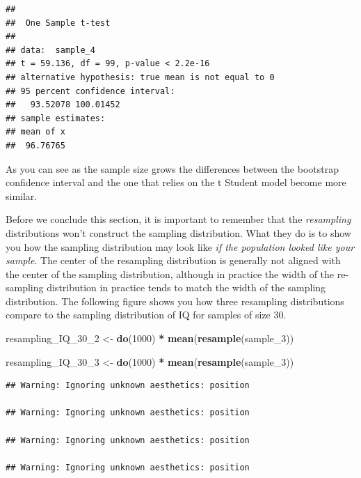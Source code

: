 \documentclass[]{book}
\newenvironment{Shaded}{\begin{snugshade}}{\end{snugshade}}
\newcommand{\DecValTok}[1]{\textcolor[rgb]{0.00,0.00,0.81}{#1}}
\newcommand{\KeywordTok}[1]{\textcolor[rgb]{0.13,0.29,0.53}{\textbf{#1}}}
\newcommand{\NormalTok}[1]{#1}
\newcommand{\OperatorTok}[1]{\textcolor[rgb]{0.81,0.36,0.00}{\textbf{#1}}}
\newcommand{\StringTok}[1]{\textcolor[rgb]{0.31,0.60,0.02}{#1}}
\theoremstyle{definition}
\theoremstyle{definition}
\theoremstyle{definition}
\theoremstyle{remark}
\begin{document}
\begin{verbatim}
## 
##  One Sample t-test
## 
## data:  sample_4
## t = 59.136, df = 99, p-value < 2.2e-16
## alternative hypothesis: true mean is not equal to 0
## 95 percent confidence interval:
##   93.52078 100.01452
## sample estimates:
## mean of x 
##  96.76765
\end{verbatim}

As you can see as the sample size grows the differences between the
bootstrap confidence interval and the one that relies on the t Student
model become more similar.

Before we conclude this section, it is important to remember that the
\emph{resampling} distributions won't construct the sampling
distribution. What they do is to show you how the sampling distribution
may look like \emph{if the population looked like your sample}. The
center of the resampling distribution is generally not aligned with the
center of the sampling distribution, although in practice the width of
the re-sampling distribution in practice tends to match the width of the
sampling distribution. The following figure shows you how three
resampling distributions compare to the sampling distribution of IQ for
samples of size 30.

\begin{Shaded}
\begin{Highlighting}[]
\NormalTok{resampling_IQ_}\DecValTok{30}\NormalTok{_}\DecValTok{2}\NormalTok{ <-}\StringTok{ }\KeywordTok{do}\NormalTok{(}\DecValTok{1000}\NormalTok{) }\OperatorTok{*}\StringTok{ }\KeywordTok{mean}\NormalTok{(}\KeywordTok{resample}\NormalTok{(sample_}\DecValTok{3}\NormalTok{))}
\end{Highlighting}
\end{Shaded}

\begin{Shaded}
\begin{Highlighting}[]
\NormalTok{resampling_IQ_}\DecValTok{30}\NormalTok{_}\DecValTok{3}\NormalTok{ <-}\StringTok{ }\KeywordTok{do}\NormalTok{(}\DecValTok{1000}\NormalTok{) }\OperatorTok{*}\StringTok{ }\KeywordTok{mean}\NormalTok{(}\KeywordTok{resample}\NormalTok{(sample_}\DecValTok{3}\NormalTok{))}
\end{Highlighting}
\end{Shaded}

\begin{verbatim}
## Warning: Ignoring unknown aesthetics: position

## Warning: Ignoring unknown aesthetics: position

## Warning: Ignoring unknown aesthetics: position

## Warning: Ignoring unknown aesthetics: position
\end{verbatim}
\end{document}
